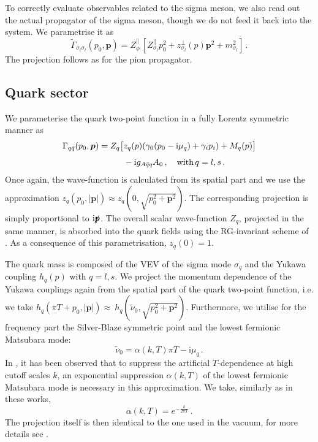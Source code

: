 \documentclass[10pt,prd,superscriptaddress,twocolumn]{revtex4-2}
\newcommand{\imag}{\text{i}}
\begin{document}
To correctly evaluate observables related to the sigma meson, we also read out the actual propagator of the sigma meson, though we do not feed it back into the system. We parametrise it as
%
\begin{equation}
	\tilde\Gamma_{\sigma_l\sigma_l}(p_0, \boldsymbol{p}) = Z_\phi^\parallel\,\left[ Z_{\sigma_l}^\parallel p_0^2 + z_{\sigma_l}^\perp(p) \boldsymbol{p}^2 + m_{\sigma_l}^2 \right]
	\,.
\end{equation}
%
The projection follows as for the pion propagator.


\subsection{Quark sector}
\label{sec:QCDPD_setup_quark}

We parameterise the quark two-point function in a fully Lorentz symmetric manner as
%
\begin{align}
	\Gamma_{q\bar{q}}(p_0, \boldsymbol{p}) = Z_q \big[&
	z_{q}(p) (\gamma_0(p_0 - \imag \mu_q) + \gamma_i p_i) + M_q(p)
	\big]	 \notag\\[1ex]
	&- \imag g_{A\bar{q}q} A_0
	\,,\quad\text{with}\,q=l,s
	\,.
\end{align}
%
Once again, the wave-function is calculated from its spatial part and we use the approximation ${z_{q}(p_0,|\boldsymbol{p}|) \approx z_{q}(0, \sqrt{p_0^2 + \boldsymbol{p}^2})}$.
The corresponding projection is simply proportional to $\imag\slashed{\boldsymbol{p}}$.
The overall scalar wave-function $Z_q$, projected in the same manner, is absorbed into the quark fields using the {RG}-invariant scheme of \cite{Ihssen:2024miv}.
As a consequence of this parametrisation, $z_{q}(0) = 1$.

The quark mass is composed of the {VEV} of the sigma mode $\sigma_q$ and the Yukawa coupling $h_q(p)$ with $q=l,s$. We project the momentum dependence of the Yukawa couplings again from the spatial part of the quark two-point function, i.e. we take ${h_q(\pi T + p_0,|\boldsymbol{p}|) \approx~h_q(\tilde\nu_0, \sqrt{p_0^2 + \boldsymbol{p}^2})}$. 
Furthermore, we utilise for the frequency part the Silver-Blaze symmetric point and the lowest fermionic Matsubara mode:
%
\begin{equation}
	\tilde \nu_0 = \alpha(k,T) \pi T - \imag \mu_q
	\,.
\end{equation}
%
In \cite{Fu:2015naa, Fu:2016tey, Fu:2019hdw}, it has been observed that to suppress the artificial $T$-dependence at high cutoff scales $k$, an exponential suppression $\alpha(k,T)$ of the lowest fermionic Matsubara mode is necessary in this approximation. We take, similarly as in these works,
%
\begin{equation}
	\alpha(k,T) = e^{-\frac{k}{2\pi T}}
	\,.
\end{equation}
%
The projection itself is then identical to the one used in the vacuum, for more details see \cite{Ihssen:2024miv}.
\end{document}
